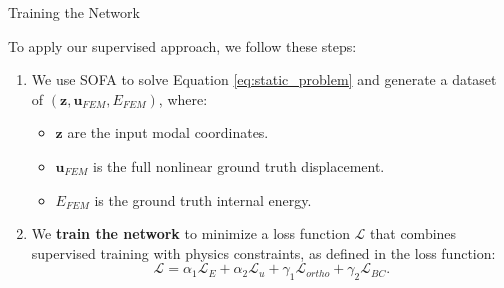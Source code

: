 \documentclass[9pt]{beamer}
\begin{document}
\begin{frame}{Training the Network}
    
    To apply our supervised approach, we follow these steps:
    \vspace{2em}
        \begin{enumerate}
            \item We use SOFA \cite{Faure_Duriez_Delingette_Allard_Gilles_Marchesseau_Talbot_Courtecuisse_Bousquet_Peterlik_2012} to solve Equation \ref{eq:static_problem} and generate a dataset of \( (\mathbf{z}, \bm{u}_{FEM}, E_{FEM}) \), where:
                        \begin{itemize}
                            \item \( \mathbf{z} \) are the input modal coordinates.
                            \item \( \bm{u}_{FEM} \) is the full nonlinear ground truth displacement.
                            \item \( E_{FEM} \) is the ground truth internal energy.
                        \end{itemize}
                        \item We \textbf{train the network} to minimize a loss function \(\mathcal{L}\) that combines supervised training with physics constraints, as defined in the loss function:
                        \[
                            \mathcal{L} = \alpha_1 \mathcal{L}_E + \alpha_2 \mathcal{L}_u + \gamma_1 \mathcal{L}_{ortho} + \gamma_2 \mathcal{L}_{BC}.
                        \]
        \end{enumerate}
\end{frame}
\end{document}
